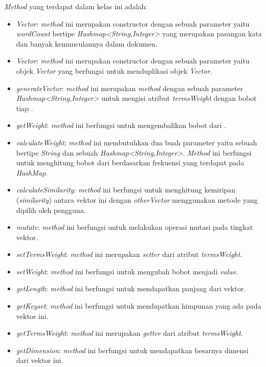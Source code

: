 \textit{Method} yang terdapat dalam kelas ini adalah:

\begin{itemize}
	\item \textit{Vector}: \textit{method} ini merupakan constructor dengan sebuah parameter yaitu \textit{wordCount} bertipe \textit{Hashmap<String,Integer>} yang merupakan pasangan kata dan banyak kemunculannya dalam dokumen.
	\item \textit{Vector}: \textit{method} ini merupakan constructor dengan sebuah parameter yaitu objek \textit{Vector} yang berfungsi untuk menduplikasi objek \textit{Vector}.
	\item \textit{generateVector}: \textit{method} ini merupakan \textit{method} dengan sebuah parameter \textit{Hashmap<String,Integer>} untuk mengisi atribut \textit{termsWeight} dengan bobot tiap \term.
	\item \textit{getWeight}: \textit{method} ini berfungsi untuk mengembalikan bobot dari \term.
	\item \textit{calculateWeight}: \textit{method} ini membutuhkan dua buah parameter yaitu sebuah \term bertipe \textit{String} dan sebuah \textit{Hashmap<String,Integer>}. \textit{Method} ini berfungsi untuk menghitung bobot dari \term berdasarkan frekuensi yang terdapat pada \textit{HashMap}.
	\item \textit{calculateSimilarity}: \textit{method} ini berfungsi untuk menghitung kemiripan (\textit{similarity}) antara vektor ini dengan \textit{otherVector} menggunakan metode yang dipilih oleh pengguna.
	\item \textit{mutate}: \textit{method} ini berfungsi untuk melakukan operasi mutasi pada tingkat vektor.
	\item \textit{setTermsWeight}: \textit{method} ini merupakan \textit{setter} dari atribut \textit{termsWeight}.
	\item \textit{setWeight}: \textit{method} ini berfungsi untuk mengubah bobot \term menjadi \textit{value}.
	\item \textit{getLength}: \textit{method} ini berfungsi untuk mendapatkan panjang dari vektor.
	\item \textit{getKeyset}: \textit{method} ini berfungsi untuk mendapatkan himpunan \term yang ada pada vektor ini.
	\item \textit{getTermsWeight}: \textit{method} ini merupakan \textit{getter} dari atribut \textit{termsWeight}.
	\item \textit{getDimension}: \textit{method} ini berfungsi untuk mendapatkan besarnya dimensi dari vektor ini.
\end{itemize}

